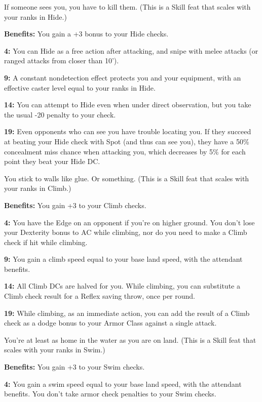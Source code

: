 If someone sees you, you have to kill them. (This is a Skill feat that scales with your ranks in Hide.)

\textbf{Benefits:} You gain a +3 bonus to your Hide checks.

\textbf{4:} You can Hide as a free action after attacking, and snipe with melee attacks (or ranged attacks from closer than 10').

\textbf{9:} A constant nondetection effect protects you and your equipment, with an effective caster level equal to your ranks in Hide.

\textbf{14:} You can attempt to Hide even when under direct observation, but you take the usual -20 penalty to your check.

\textbf{19:} Even opponents who can see you have trouble locating you. If they succeed at beating your Hide check with Spot (and thus can see you), they have a 50\% concealment miss chance when attacking you, which decreases by 5\% for each point they beat your Hide DC.


You stick to walls like glue. Or something. (This is a Skill feat that scales with your ranks in Climb.)

\textbf{Benefits:} You gain +3 to your Climb checks.

\textbf{4:} You have the Edge on an opponent if you're on higher ground. You don't lose your Dexterity bonus to AC while climbing, nor do you need to make a Climb check if hit while climbing.

\textbf{9:} You gain a climb speed equal to your base land speed, with the attendant benefits.

\textbf{14:} All Climb DCs are halved for you. While climbing, you can substitute a Climb check result for a Reflex saving throw, once per round.

\textbf{19:} While climbing, as an immediate action, you can add the result of a Climb check as a dodge bonus to your Armor Class against a single attack.


You're at least as home in the water as you are on land. (This is a Skill feat that scales with your ranks in Swim.)

\textbf{Benefits:} You gain +3 to your Swim checks.

\textbf{4:} You gain a swim speed equal to your base land speed, with the attendant benefits. You don't take armor check penalties to your Swim checks.

